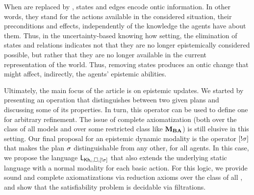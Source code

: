 When  are replaced by , states and edges encode ontic information. In other words, they stand for the actions available in the considered situation, their preconditions and effects, independently of the knowledge the agents have about them.  
%
%
Thus, in the uncertainty-based knowing how setting, the elimination of states and relations indicates not that they are no longer epistemically considered possible, but rather that they are no longer available in the current representation of the world. 
Thus, removing states produces an ontic change that might affect,
indirectly, the agents’ epistemic abilities. 


Ultimately, the main focus of the article is on epistemic updates.  We started by presenting an operation that distinguishes between two given plans and discussing some of its properties. In turn, this operator can be used to define one for arbitrary refinement. The issue of complete axiomatization (both over the class of all models and over some restricted class like $\mathbf{M}_{\mathbf{BA}}$) is still elusive in this setting.  
Our final proposal for an epistemic dynamic modality is the operator $[!\sigma]$ that makes the plan $\sigma$ distinguishable from any other, for all agents. In this case, we propose the language $\mathsf{L}_{{\sf Kh}_i,\square,[!\sigma]}$ that also extends the underlying static language with a normal modality for each basic action. For this logic, we provide sound and complete axiomatizations via reduction axioms over the class of all , and show that the satisfiability problem is decidable via filtrations.  

